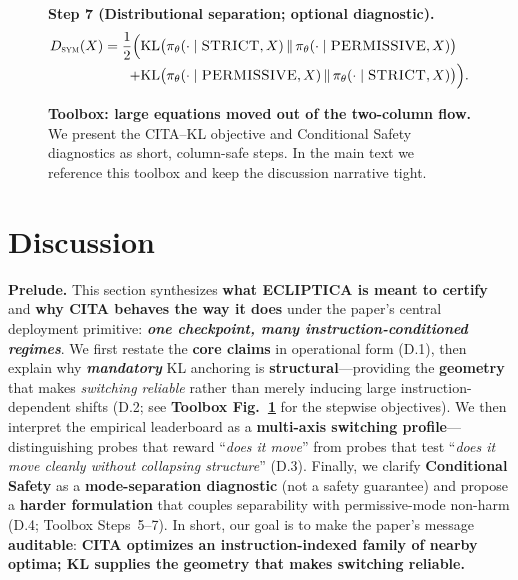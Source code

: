 \begin{figure}[ht!]
\begin{tcolorbox}[
  colback=gray!3,
  colframe=black!65,
  boxrule=0.6pt,
  sharp corners,
  left=6pt,right=6pt,top=6pt,bottom=6pt,
  enhanced,
  breakable
]
{\noindent\textbf{Step 7 (Distributional separation; optional diagnostic).}\;
\[
\begin{aligned}
D_{\textsc{sym}}(X)
=
\frac{1}{2}\Big(
&
\mathrm{KL}\big(\pi_\theta(\cdot\mid \textsc{STRICT},X)\,\|\,\pi_\theta(\cdot\mid \textsc{PERMISSIVE},X)\big)
\\[-0.1em]
+
&
\mathrm{KL}\big(\pi_\theta(\cdot\mid \textsc{PERMISSIVE},X)\,\|\,\pi_\theta(\cdot\mid \textsc{STRICT},X)\big)
\Big).
\end{aligned}
\]
}
\end{tcolorbox}
\vspace{-0.55em}
\caption{\textbf{Toolbox: large equations moved out of the two-column flow.} We present the CITA--KL objective and Conditional Safety diagnostics as short, column-safe steps. In the main text we reference this toolbox and keep the discussion narrative tight.}
\label{fig:toolbox_cita_condsafety}
\vspace{-1.0em}
\end{figure}



\section{Discussion}
\label{sec:discussion}

\vspace{-0.35em}
\noindent\textbf{Prelude.}
This section synthesizes \textbf{what ECLIPTICA is meant to certify} and \textbf{why CITA behaves the way it does} under the paper’s central deployment primitive: \textbf{\emph{one checkpoint, many instruction-conditioned regimes}}. We first restate the \textbf{core claims} in operational form (D.1), then explain why \textbf{\emph{mandatory}} KL anchoring is \textbf{structural}—providing the \textbf{geometry} that makes \emph{switching reliable} rather than merely inducing large instruction-dependent shifts (D.2; see \textbf{Toolbox Fig.~\ref{fig:toolbox_cita_condsafety}} for the stepwise objectives). We then interpret the empirical leaderboard as a \textbf{multi-axis switching profile}—distinguishing probes that reward ``\emph{does it move}'' from probes that test ``\emph{does it move cleanly without collapsing structure}'' (D.3). Finally, we clarify \textbf{Conditional Safety} as a \textbf{mode-separation diagnostic} (not a safety guarantee) and propose a \textbf{harder formulation} that couples separability with permissive-mode non-harm (D.4; Toolbox Steps~5--7). In short, our goal is to make the paper’s message \textbf{auditable}: \textbf{CITA optimizes an instruction-indexed family of nearby optima; KL supplies the geometry that makes switching reliable.}

